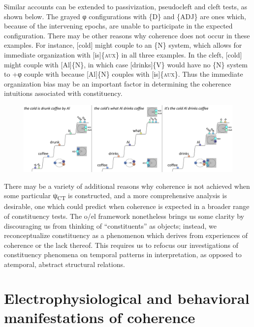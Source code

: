   Similar accounts can be extended to passivization, pseudocleft and cleft tests, as shown below. The grayed φ configurations with \{D\} and \{ADJ\} are ones which, because of the intervening epochs, are unable to participate in the expected configuration. There may be other reasons why coherence does not occur in these examples. For instance, [cold] might couple to an \{N\} system, which allows for immediate organization with [is]\{\textsc{aux}\} in all three examples. In the cleft, [cold] might couple with [Al]\{N\}, in which case [drinks]\{V\} would have no \{N\} system to +φ couple with because [Al]\{N\} couples with [is]\{\textsc{aux\}.} Thus the immediate organization bias may be an important factor in determining the coherence intuitions associated with constituency.   

  
\begin{figure}
\includegraphics[width=\textwidth]{figures/Tilsen-img140.png}
\caption{\missingcaption}
\label{fig:6:21}
\end{figure}
 

  There may be a variety of additional reasons why coherence is not achieved when some particular ψ\textsubscript{CT} is constructed, and a more comprehensive analysis is desirable, one which could predict when coherence is expected in a broader range of constituency tests. The o/el framework nonetheless brings us some clarity by discouraging us from thinking of “constituents” as objects; instead, we reconceptualize constituency as a phenomenon which derives from experiences of coherence or the lack thereof. This requires us to refocus our investigations of constituency phenomena on temporal patterns in interpretation, as opposed to atemporal, abstract structural relations.

\section{Electrophysiological and behavioral manifestations of coherence}


